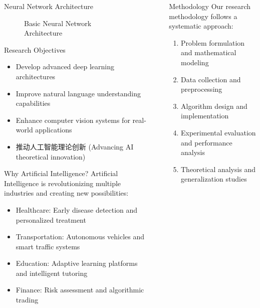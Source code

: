 \documentclass{ctexbeamer}
\newlength{\sepwidth}
\newlength{\colwidth}
\newcommand{\separatorcolumn}{\begin{column}{\sepwidth}\end{column}}
\begin{document}
\begin{frame}[t]
\begin{columns}[t]
\begin{column}{\colwidth}
\begin{block}{Neural Network Architecture}
\begin{figure}
        \caption{Basic Neural Network Architecture}
        \label{fig:nn_arch}
    \end{figure}
\end{block}

\begin{block}{Research Objectives}
\begin{itemize}
  \item Develop advanced deep learning architectures
  \item Improve natural language understanding capabilities
  \item Enhance computer vision systems for real-world applications
  \item 推动人工智能理论创新 (Advancing AI theoretical innovation)
\end{itemize}
\end{block}

\begin{alertblock}{Why Artificial Intelligence?}
Artificial Intelligence is revolutionizing multiple industries and creating new possibilities:
\begin{itemize}
  \item Healthcare: Early disease detection and personalized treatment
  \item Transportation: Autonomous vehicles and smart traffic systems
  \item Education: Adaptive learning platforms and intelligent tutoring
  \item Finance: Risk assessment and algorithmic trading
\end{itemize}
\end{alertblock}
\end{column}

\separatorcolumn

\begin{column}{\colwidth}
\begin{block}{Methodology}
Our research methodology follows a systematic approach:\hfill
\begin{enumerate}
  \item Problem formulation and mathematical modeling
  \item Data collection and preprocessing
  \item Algorithm design and implementation
  \item Experimental evaluation and performance analysis
  \item Theoretical analysis and generalization studies
\end{enumerate}
\end{block}


\end{column}
\end{columns}
\end{frame}
\end{document}
